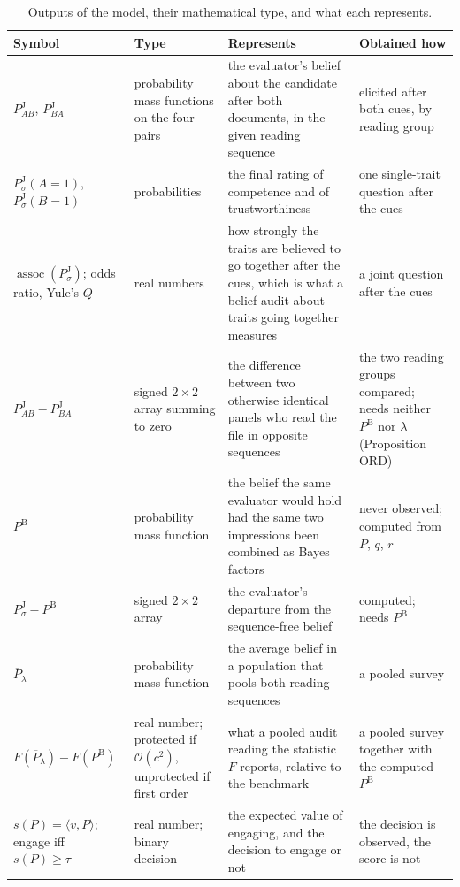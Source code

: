\documentclass[11pt,a4paper]{article}
\newcommand{\PB}{P^{\mathrm{B}}}
\newcommand{\PJ}{P^{\mathrm{J}}}
\newcommand{\Pbar}{\overline{P}}
\newcommand{\assoc}{\operatorname{assoc}}
\newcommand{\bigO}{\mathcal{O}}
\newcommand{\vv}{v}
\begin{document}
\begin{table}[htbp]
\centering
\footnotesize
\caption{Outputs of the model, their mathematical type, and what each represents.}\label{tab:outputs}
\begin{tabular}{@{}p{2.9cm}p{3.0cm}p{4.9cm}p{3.4cm}@{}}
\toprule
\textbf{Symbol} & \textbf{Type} & \textbf{Represents} & \textbf{Obtained how}\\
\midrule
$\PJ_{AB}$, $\PJ_{BA}$ & probability mass functions on the four pairs & the evaluator's belief about the candidate after both documents, in the given reading sequence & elicited after both cues, by reading group\\
\addlinespace
$\PJ_\sigma(A{=}1)$, $\PJ_\sigma(B{=}1)$ & probabilities & the final rating of competence and of trustworthiness & one single-trait question after the cues\\
\addlinespace
$\assoc(\PJ_\sigma)$; odds ratio, Yule's $Q$ & real numbers & how strongly the traits are believed to go together after the cues, which is what a belief audit about traits going together measures & a joint question after the cues\\
\addlinespace
$\PJ_{AB}-\PJ_{BA}$ & signed $2\times2$ array summing to zero & the difference between two otherwise identical panels who read the file in opposite sequences & the two reading groups compared; needs neither $\PB$ nor $\lambda$ (Proposition ORD)\\
\addlinespace
$\PB$ & probability mass function & the belief the same evaluator would hold had the same two impressions been combined as Bayes factors & never observed; computed from $P$, $q$, $r$\\
\addlinespace
$\PJ_\sigma-\PB$ & signed $2\times2$ array & the evaluator's departure from the sequence-free belief & computed; needs $\PB$\\
\addlinespace
$\Pbar_\lambda$ & probability mass function & the average belief in a population that pools both reading sequences & a pooled survey\\
\addlinespace
$F(\Pbar_\lambda)-F(\PB)$ & real number; protected if $\bigO(c^{2})$, unprotected if first order & what a pooled audit reading the statistic $F$ reports, relative to the benchmark & a pooled survey together with the computed $\PB$\\
\addlinespace
$s(P)=\langle\vv,P\rangle$; engage iff $s(P)\ge\tau$ & real number; binary decision & the expected value of engaging, and the decision to engage or not & the decision is observed, the score is not\\

\end{tabular}
\end{table}
\end{document}
